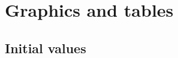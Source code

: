 
{}
\label{app:appendix}


%  
%
%

\centering

\chapter{Graphics and tables}

\section{Initial values}
\label{app:initials}

